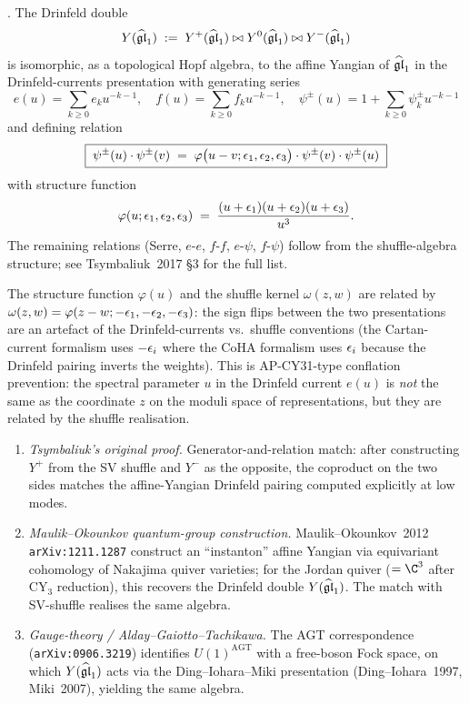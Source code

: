 \begin{theorem}
\label{opus:thm:tsymbaliuk}
\ClaimStatusTheorem. The Drinfeld double
\[
 Y(\widehat{\mathfrak{gl}}_1) \;:=\; Y^+(\widehat{\mathfrak{gl}}_1) \bowtie Y^0(\widehat{\mathfrak{gl}}_1) \bowtie Y^-(\widehat{\mathfrak{gl}}_1)
\]
is isomorphic, as a topological Hopf algebra, to the affine Yangian of $\widehat{\mathfrak{gl}}_1$
in the Drinfeld-currents presentation with generating series
\[
 e(u) = \sum_{k \geq 0} e_k u^{-k-1}, \quad f(u) = \sum_{k \geq 0} f_k u^{-k-1},
 \quad \psi^\pm(u) = 1 + \sum_{k \geq 0} \psi_k^\pm u^{-k-1}
\]
and defining relation
\[
 \boxed{\;\psi^\pm(u) \cdot \psi^\pm(v) \;=\; \varphi\bigl(u - v; \epsilon_1, \epsilon_2, \epsilon_3\bigr)
 \cdot \psi^\pm(v) \cdot \psi^\pm(u)\;}
\]
with structure function
\[
 \varphi(u; \epsilon_1, \epsilon_2, \epsilon_3) \;=\; \frac{(u + \epsilon_1)(u + \epsilon_2)(u + \epsilon_3)}{u^3}.
\]
The remaining relations (Serre, $e$-$e$, $f$-$f$, $e$-$\psi$, $f$-$\psi$) follow from the
shuffle-algebra structure; see Tsymbaliuk~2017 \S3 for the full list.
\end{theorem}

\begin{remark}
\label{opus:rem:structure-function-vs-shuffle-kernel}
The structure function $\varphi(u)$ and the shuffle kernel $\omega(z, w)$ are related
by $\omega(z, w) = \varphi(z - w; -\epsilon_1, -\epsilon_2, -\epsilon_3)$: the sign flips between the
two presentations are an artefact of the Drinfeld-currents vs.\ shuffle conventions
(the Cartan-current formalism uses $-\epsilon_i$ where the CoHA formalism uses $\epsilon_i$
because the Drinfeld pairing inverts the weights). This is AP-CY31-type conflation
prevention: the spectral parameter $u$ in the Drinfeld current $e(u)$ is \emph{not} the
same as the coordinate $z$ on the moduli space of representations, but they are related
by the shuffle realisation.
\end{remark}

\begin{verification}
\label{opus:verif:tsymbaliuk}
\mbox{}
\begin{enumerate}
\item \emph{Tsymbaliuk's original proof.} Generator-and-relation match: after
constructing $Y^+$ from the SV shuffle and $Y^-$ as the opposite, the coproduct on the
two sides matches the affine-Yangian Drinfeld pairing computed explicitly at low modes.
\item \emph{Maulik--Okounkov quantum-group construction.} Maulik--Okounkov~2012
\texttt{arXiv:1211.1287} construct an ``instanton'' affine Yangian via equivariant
cohomology of Nakajima quiver varieties; for the Jordan quiver ($= \C^3$ after CY$_3$
reduction), this recovers the Drinfeld double $Y(\widehat{\mathfrak{gl}}_1)$. The match with SV-shuffle
realises the same algebra.
\item \emph{Gauge-theory / Alday--Gaiotto--Tachikawa.} The AGT correspondence
(\texttt{arXiv:0906.3219}) identifies $U(1)^{\mathrm{AGT}}$ with a free-boson Fock
space, on which $Y(\widehat{\mathfrak{gl}}_1)$ acts via the Ding--Iohara--Miki presentation
(Ding--Iohara~1997, Miki~2007), yielding the same algebra.
\end{enumerate}
\end{verification}

